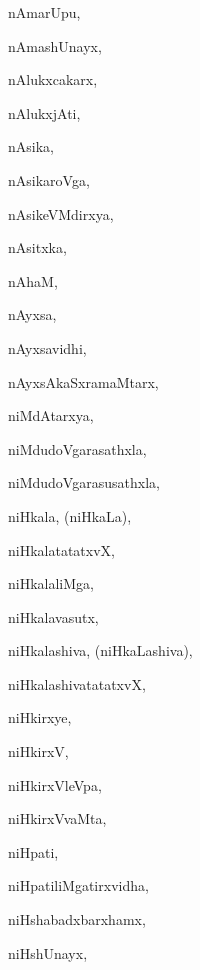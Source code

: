 \begin{multicols}{3}
{\noindent
{nAmarUpu}, \pageref{nAmarUpu}

\noindent
{nAmashUnayx}, \pageref{nAmashUnayx}

\noindent
{nAlukxcakarx}, \pageref{nAlukxcakarx}

\noindent
{nAlukxjAti}, \pageref{nAlukxjAti}

\noindent
{nAsika}, \pageref{nAsika}

\noindent
{nAsikaroVga}, \pageref{nAsikaroVga}

\noindent
{nAsikeVMdirxya}, \pageref{nAsikeVMdirxya}

\noindent
{nAsitxka}, \pageref{nAsitxka}

\noindent
{nAhaM}, \pageref{nAhaM}

\noindent
{nAyxsa}, \pageref{nAyxsa}

\noindent
{nAyxsavidhi}, \pageref{nAyxsavidhi}

\noindent
{nAyxsAkaSxramaMtarx}, \pageref{nAyxsAkaSxramaMtarx}

\noindent
{niMdAtarxya}, \pageref{niMdAtarxya}

\noindent
{niMdudoVgarasathxla}, \pageref{niMdudoVgarasathxla}

\noindent
{niMdudoVgarasusathxla}, \pageref{niMdudoVgarasusathxla}

\noindent
{niHkala, (niHkaLa)}, \pageref{niHkala,niHkaLa}

\noindent
{niHkalatatatxvX}, \pageref{niHkalatatatxvX}

\noindent
{niHkalaliMga}, \pageref{niHkalaliMga}

\noindent
{niHkalavasutx}, \pageref{niHkalavasutx}

\noindent
{niHkalashiva, (niHkaLashiva)}, \pageref{niHkalashiva,niHkaLashiva}

\noindent
{niHkalashivatatatxvX}, \pageref{niHkalashivatatatxvX}

\noindent
{niHkirxye}, \pageref{niHkirxye}

\noindent
{niHkirxV}, \pageref{niHkirxV}

\noindent
{niHkirxVleVpa}, \pageref{niHkirxVleVpa}

\noindent
{niHkirxVvaMta}, \pageref{niHkirxVvaMta}

\noindent
{niHpati}, \pageref{niHpati}

\noindent
{niHpatiliMgatirxvidha}, \pageref{niHpatiliMgatirxvidha}

\noindent
{niHshabadxbarxhamx}, \pageref{niHshabadxbarxhamx}

\noindent
{niHshUnayx}, \pageref{niHshUnayx}

}
\end{multicols}
